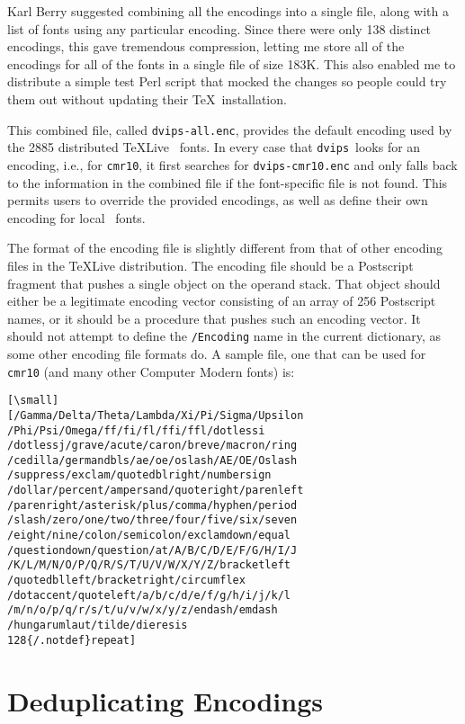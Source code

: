 \documentclass{ltugboat}
\def\dvips{\texttt{dvips}}
\begin{document}
Karl Berry suggested combining all the encodings into a single
file, along with a list of fonts using any particular encoding.
Since there were only 138 distinct encodings, this gave
tremendous compression, letting me store all of the encodings
for all of the fonts in a single file of size 183K.  This also
enabled me to distribute a simple test Perl script that mocked
the changes so people could try them out without updating their
\TeX\ installation.

This combined file, called \texttt{dvips-all.enc}, provides
the default encoding used by the 2885 distributed \TeX Live
\MF\ fonts.  In every case that \dvips\ looks for an encoding,
i.e., for \texttt{cmr10}, it first searches for \texttt{dvips-cmr10.enc}
and only falls back to the information in the combined file if
the font-specific file is not found.  This permits users to override
the provided encodings, as well as define their
own encoding for local \MF\ fonts.

The format of the encoding file is slightly different from that
of other encoding files in the \TeX Live distribution.  The
encoding file should be a Postscript fragment that pushes a
single object on the operand stack.  That object should either be a
legitimate encoding vector consisting of an array of 256
Postscript names, or it should be a procedure that pushes
such an encoding vector.  It should not attempt to define
the \texttt{/Encoding} name in the current dictionary, as some other
encoding file formats do.  A sample file, one that can be used
for \texttt{cmr10} (and many other Computer Modern fonts) is:

\begin{verbatim}[\small]
[/Gamma/Delta/Theta/Lambda/Xi/Pi/Sigma/Upsilon
/Phi/Psi/Omega/ff/fi/fl/ffi/ffl/dotlessi
/dotlessj/grave/acute/caron/breve/macron/ring
/cedilla/germandbls/ae/oe/oslash/AE/OE/Oslash
/suppress/exclam/quotedblright/numbersign
/dollar/percent/ampersand/quoteright/parenleft
/parenright/asterisk/plus/comma/hyphen/period
/slash/zero/one/two/three/four/five/six/seven
/eight/nine/colon/semicolon/exclamdown/equal
/questiondown/question/at/A/B/C/D/E/F/G/H/I/J
/K/L/M/N/O/P/Q/R/S/T/U/V/W/X/Y/Z/bracketleft
/quotedblleft/bracketright/circumflex
/dotaccent/quoteleft/a/b/c/d/e/f/g/h/i/j/k/l
/m/n/o/p/q/r/s/t/u/v/w/x/y/z/endash/emdash
/hungarumlaut/tilde/dieresis
128{/.notdef}repeat]
\end{verbatim}

\section{Deduplicating Encodings}
\end{document}
